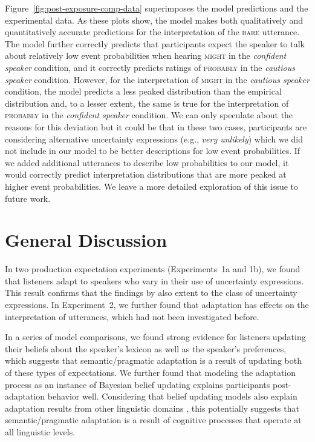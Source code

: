 \documentclass[lucida,biblatex]{sp} %
\newcommand{\figref}[1]{Figure~\ref{#1}}
\begin{document}
\figref{fig:post-exposure-comp-data} superimposes the model predictions and the experimental data. As these plots show, the model makes both qualitatively and quantitatively accurate predictions for the interpretation of the \textsc{bare} utterance. The model further correctly predicts that participants expect the speaker to talk about relatively low event probabilities when hearing \textsc{might} in the \textit{confident speaker} condition, and it correctly predicts ratings of \textsc{probably} in the \textit{cautious speaker} condition. However, for the interpretation of \textsc{might} in the \textit{cautious speaker} condition, the model predicts a less peaked distribution than the empirical distribution and, to a lesser extent, the same is true for the interpretation of \textsc{probably} in the \textit{confident speaker} condition. We can only speculate about the reasons for this deviation but it could be that in these two cases, participants are considering alternative uncertainty expressions (e.g., \textit{very unlikely}) which we did not include in our model to be better descriptions for low event probabilities. If we added additional utterances to describe low probabilities to our model, it would correctly predict interpretation distributions that are more peaked at higher event probabilities. We leave a more detailed exploration of this issue to future work.

\section{General Discussion}

In two production expectation experiments (Experiments~1a and 1b), we found that listeners adapt to speakers who vary in their use of uncertainty expressions. This result confirms that 
the findings by \citet{Yildirim2016} also extent to the class of uncertainty expressions. In Experiment~2, we further found that adaptation has effects on the interpretation
of utterances, which had not been investigated before.

In a series of model comparisons, we found strong evidence for listeners updating their beliefs about the speaker's lexicon as well as the speaker's preferences, which suggests
that semantic/pragmatic adaptation is a result of updating both of these types of expectations. We further found that modeling the adaptation process as an instance of Bayesian
belief updating explains participants post-adaptation behavior well. Considering that belief updating models also explain adaptation results from other linguistic domains 
\citep[e.g.,][]{Kleinschmidt2012,Kleimschmidt2015,Roettger2019}, this potentially suggests that semantic/pragmatic adaptation is a result of cognitive processes that operate at all
linguistic levels.
\end{document}
